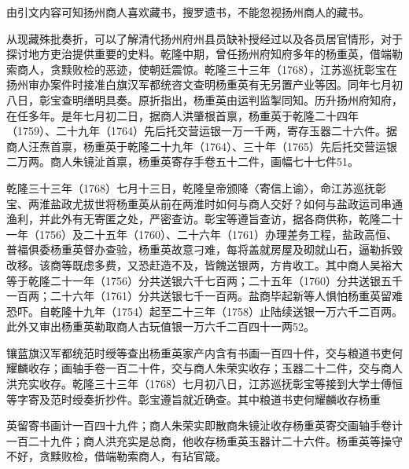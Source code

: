 由引文内容可知扬州商人喜欢藏书，搜罗遗书，不能忽视扬州商人的藏书。

从现藏殊批奏折，可以了解清代扬州府州县员缺补授经过以及各员居官情形，对于探讨地方吏治提供重要的史料。乾隆中期，曾任扬州府知府多年的杨重英，借端勒索商人，贪黩败检的恶迹，使朝廷震惊。乾隆三十三年（1768），江苏巡抚彰宝在扬州审办案件时接准白旗汉军都统咨文查明杨重英有无另置产业等因。同年七月初八日，彰宝查明缮明具奏。原折指出，杨重英由运判监掣同知。历升扬州府知府，在任多年。是年七月初二日，据商人洪肇根首禀，杨重英于乾隆二十四年（1759）、二十九年（1764）先后托交营运银一万一千两，寄存玉器二十六件。据商人汪焘首禀，杨重英于乾隆二十九年（1764）、三十年（1765）先后托交营运银二万两。商人朱镜沚首禀，杨重英寄存手卷五十二件，画幅七十七件51。

乾隆三十三年（1768）七月十三日，乾隆皇帝颁降〈寄信上谕〉，命江苏巡抚彰宝、两淮盐政尤拔世将杨重英从前在两淮时如何与商人交好？如何与盐政运司串通渔利，并此外有无寄匿之处，严密查访。彰宝等遵旨查访，据各商供称，乾隆二十一年（1756）及二十五年（1760）、二十六年（1761）办理差务工程，盐政高恒、普福俱委杨重英督办查验，杨重英故意刁难，每将盖就房屋及砌就山石，逼勒拆毁改移。该商等既虑多费，又恐赶造不及，皆餽送银两，方肯收工。其中商人吴裕大等于乾隆二十一年（1756）分共送银六千七百两；二十五年（1760）分共送银五千一百两；二十六年（1761）分共送银七千一百两。盐商毕起新等人惧怕杨重英留难恐吓。自乾隆十九年（1754）起至二十三年（1758）止陆续送银一万六千二百两。此外又审出杨重英勒取商人古玩值银一万六千二百四十一两52。

镶蓝旗汉军都统范时绶等查出杨重英家产内含有书画一百四十件，交与粮道书吏何耀麟收存；画轴手卷一百二十件，交与商人朱荣实收存；玉器二十二件，交与商人洪充实收存。乾隆三十三年（1768）七月初八日，江苏巡抚彰宝等接到大学士傅恒等字寄及范时绶奏折抄件。彰宝遵旨就近确查。其中粮道书吏何耀麟收存杨重

\vfill
\begin{BookNotes}
\end{BookNotes}

\noindent 英留寄书画计一百四十九件；商人朱荣实即散商朱镜沚收存杨重英寄交画轴手卷计一百二十九件；商人洪充实是总商，他收存杨重英玉器计二十六件。杨重英等操守不好，贪黩败检，借端勒索商人，有玷官箴。

